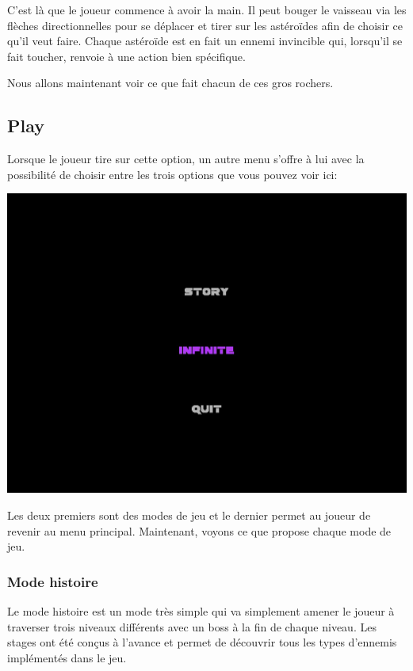 \documentclass{article}
\begin{document}
C'est là que le joueur commence à avoir la main. Il peut bouger le vaisseau via les flèches directionnelles pour se déplacer et tirer sur les astéroïdes afin de choisir ce qu'il veut faire. Chaque astéroïde est en fait un ennemi invincible qui, lorsqu'il se fait toucher, renvoie à une action bien spécifique.

Nous allons maintenant voir ce que fait chacun de ces gros rochers. 

\subsection{Play}

Lorsque le joueur tire sur cette option, un autre menu s'offre à lui avec la possibilité de choisir entre les trois options que vous pouvez voir ici:

\begin{center}
\includegraphics[scale=0.5]{images/sousmenu.jpg}
\end{center}

Les deux premiers sont des modes de jeu et le dernier permet au joueur de revenir au menu principal. Maintenant, voyons ce que propose chaque mode de jeu.

\subsubsection{Mode histoire}

Le mode histoire est un mode très simple qui va simplement amener le joueur à traverser trois niveaux différents avec un boss à la fin de chaque niveau. Les stages ont été conçus à l'avance et permet de découvrir tous les types d'ennemis implémentés dans le jeu.
\end{document}
